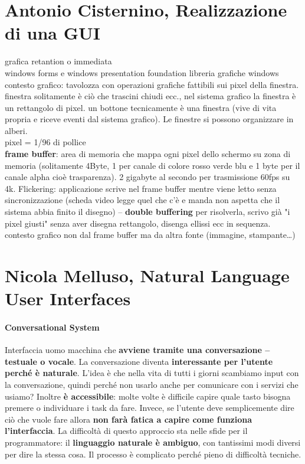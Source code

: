 \documentclass[10pt]{article}
\begin{document}
\section{Antonio Cisternino, Realizzazione di una GUI}
grafica retantion o immediata\\
windows forms e windows presentation foundation libreria grafiche windows\\
contesto grafico: tavolozza con operazioni grafiche fattibili sui pixel della finestra.\\
finestra solitamente è ciò che trascini chiudi ecc., nel sistema grafico la finestra è un rettangolo di pixel. un bottone tecnicamente è una finestra (vive di vita propria e riceve eventi dal sistema grafico). Le finestre si possono organizzare in alberi.\\
pixel = 1/96 di pollice\\
\textbf{frame buffer}: area di memoria che mappa ogni pixel dello schermo su zona di memoria (solitamente 4Byte, 1 per canale di colore rosso verde blu e 1 byte per il canale alpha cioè trasparenza). 2 gigabyte al secondo per trasmissione 60fps su 4k. Flickering: applicazione scrive nel frame buffer mentre viene letto senza sincronizzazione (scheda video legge quel che c'è e manda non aspetta che il sistema abbia finito il disegno) -- \textbf{double buffering} per risolverla, scrivo già "i pixel giusti" senza aver disegna rettangolo, disenga ellissi ecc in sequenza. contesto grafico non dal frame buffer ma da altra fonte (immagine, stampante\ldots)
\section{Nicola Melluso, Natural Language User Interfaces}
\paragraph{Conversational System} Interfaccia uomo macchina che \textbf{avviene tramite una conversazione -- testuale o vocale}. La conversazione diventa \textbf{interessante per l'utente perché è naturale}. L'idea è che nella vita di tutti i giorni scambiamo input con la conversazione, quindi perché non usarlo anche per comunicare con i servizi che usiamo? Inoltre \textbf{è accessibile}: molte volte è difficile capire quale tasto bisogna premere o individuare i task da fare. Invece, se l'utente deve semplicemente dire ciò che vuole fare allora \textbf{non farà fatica a capire come funziona l'interfaccia}.
La difficoltà di questo approccio sta nelle sfide per il programmatore: il \textbf{linguaggio naturale è ambiguo}, con tantissimi modi diversi per dire la stessa cosa. Il processo è complicato perché pieno di difficoltà tecniche.
\end{document}
